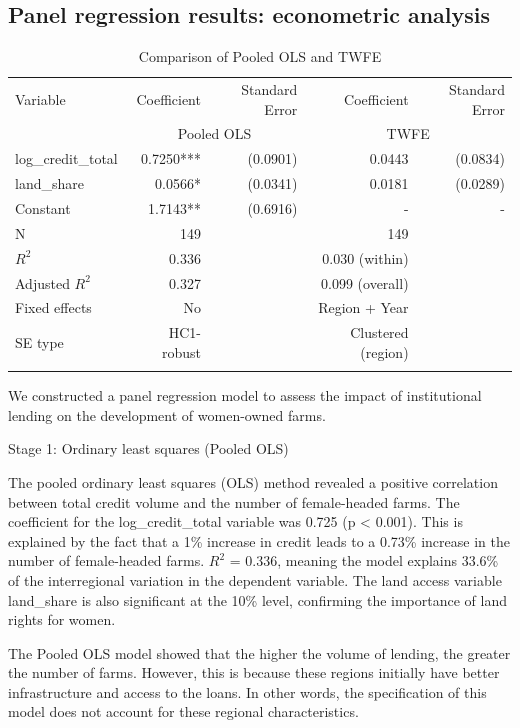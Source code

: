 ﻿\documentclass[sn-mathphys-num]{sn-jnl}
\begin{document}
\subsection{Panel regression results: econometric analysis}

\begin{table}[h]
\caption{Comparison of Pooled OLS and TWFE}\label{tab:pooled-twfe}
\small
\begin{tabular*}{\textwidth}{@{\extracolsep{\fill}}p{}rrrr@{}}
\toprule
Variable & Coefficient & Standard Error & Coefficient & Standard Error\\
 & \multicolumn{2}{c}{Pooled OLS} & \multicolumn{2}{c}{TWFE}\\
\midrule
log\_credit\_total & 0.7250*** & (0.0901) & 0.0443 & (0.0834)\\
land\_share & 0.0566* & (0.0341) & 0.0181 & (0.0289)\\
Constant & 1.7143** & (0.6916) & - & -\\
\midrule
N & 149 &  & 149 & \\
$R^2$ & 0.336 &  & 0.030 (within) & \\
Adjusted $R^2$ & 0.327 &  & 0.099 (overall) & \\
Fixed effects & No &  & Region + Year & \\
SE type & HC1-robust &  & Clustered (region) & \\
\botrule
\end{tabular*}
\end{table}

We constructed a panel regression model to assess the impact of
institutional lending on the development of women-owned farms.

Stage 1: Ordinary least squares (Pooled OLS)

The pooled ordinary least squares (OLS) method revealed a positive
correlation between total credit volume and the number of female-headed
farms. The coefficient for the log\_credit\_total variable was 0.725 (p
\textless{} 0.001). This is explained by the fact that a 1\% increase in
credit leads to a 0.73\% increase in the number of female-headed farms.
$R^2$ = 0.336, meaning the model explains 33.6\% of the interregional
variation in the dependent variable. The land access variable
land\_share is also significant at the 10\% level, confirming the
importance of land rights for women.

The Pooled OLS model showed that the higher the volume of lending, the
greater the number of farms. However, this is because these regions
initially have better infrastructure and access to the loans. In other
words, the specification of this model does not account for these
regional characteristics.
\end{document}
